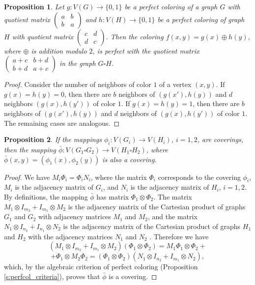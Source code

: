 \documentclass[11pt]{article}
\newtheorem{claim}{Proposition}[section]
\theoremstyle{definition}
\begin{document}
\begin{claim}\label{cartprod:2}
Let $g:V(G)\rightarrow\{0,1\}$ be a perfect coloring of a graph $G$
with quotient matrix $\begin{pmatrix}
a & b \\
b & a
\end{pmatrix}$ and $h:V(H)\rightarrow\{0,1\}$ be a perfect coloring of graph $H$ with quotient matrix
$\begin{pmatrix}
c & d \\
d & c
\end{pmatrix}$. Then the coloring $f(x,y)=g(x)\oplus h(y)$,
where $\oplus$ is addition modulo $2$, is perfect with
the quotient matrix $\begin{pmatrix}
a+c & b+d \\
b+d & a+c
\end{pmatrix}$ in the graph $G\square H$.
\end{claim}
\begin{proof}
Consider the number of neighbors of color $1$ of a vertex $(x,y)$. If
$g(x)=h(y)=0$, then there are $b$ neighbors of $(g(x'),h(y))$ and $d$ neighbors
$(g(x),h(y'))$ of color $1$. If $g(x)=h(y)=1$, then there are $b$
neighbors of $(g(x'),h(y))$ and $d$ neighbors of $(g(x),h(y'))$ of color $1$.
The remaining cases are analogous.
\end{proof}


\begin{claim}\label{claim:cartprodcover}
If the mappings $\phi_i: V(G_i)\rightarrow V(H_i)$, $i=1,2$, are coverings,
then the mapping $\bar\phi:V(G_1\square G_2)\rightarrow V(H_1\square H_2)$,
where $\bar\phi(x,y)=(\phi_1(x),\phi_2(y))$ is also a covering.
\end{claim}
\begin{proof}
We have $M_{i}\Phi_i=\Phi_i N_{i}$, where the matrix $\Phi_i$ corresponds
to the covering $\phi_i$, $M_{i}$ is the adjacency matrix of $G_i$, and
$N_{i}$ is the adjacency matrix of  $H_i$, $i=1,2$. By definitions,
the mapping $\bar\phi$ has matrix $\Phi_1\otimes\Phi_2$. The matrix
$M_{1} \otimes I_{m_{2}} + I_{m_{1}} \otimes M_{2}$ is the adjacency matrix of the Cartesian product of graphs $G_1$ and $G_2$ with
adjacency matrices $M_{1}$ and $M_{2}$, and the matrix $N_{1} \otimes
I_{n_{2}} + I_{n_{1}} \otimes N_{2}$ is the adjacency matrix of the Cartesian product of graphs $H_1$ and $H_2$ with the adjacency matrices
$N_{1}$ and $N_{2}$ . Therefore we have $$(M_{1} \otimes I_{m_{2}} +
I_{m_{1}} \otimes M_{2})(\Phi_1\otimes\Phi_2)=M_{1}\Phi_1 \otimes
\Phi_2 + $$ $$+ \Phi_1 \otimes M_{2}\Phi_2=
(\Phi_1\otimes\Phi_2)(N_{1} \otimes I_{n_{2}} + I_{m_{1}} \otimes
N_{2}), $$ which,  by the algebraic criterion of perfect coloring (Proposition \ref{s:perfcol_criteria}), proves that $\bar\phi$ is a covering.
\end{proof}
\end{document}
